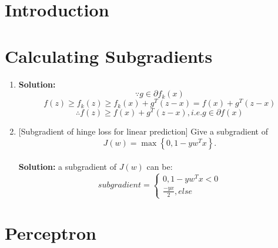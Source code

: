 \documentclass[ruled]{article}
\begin{document}
\maketitle

\section{Introduction}



\section{Calculating Subgradients}


\begin{enumerate}
\item 
\textbf{Solution:}
$$\because g\in\partial f_{k}(x)$$
$$f(z) \ge f_{k}(z) \ge f_{k}(x) + g^T(z - x) = f(x) + g^T (z - x)$$
$$\therefore f(z) \ge f(x) + g^T (z - x), i.e. g\in\partial f(x)$$

\item {[}Subgradient of hinge loss for linear prediction{]} Give a subgradient
of
\[
J(w)=\max\left\{ 0,1-yw^{T}x\right\} .
\]
\\ \textbf{Solution:}
a subgradient of $J(w)$ can be:
\begin{equation}
subgradient=\left\{
\begin{aligned}
0, 1 - yw^Tx <0\\
\frac{-yx}{2}, else
\end{aligned}
\right.
\end{equation}
\end{enumerate}

\section{Perceptron}
\end{document}
